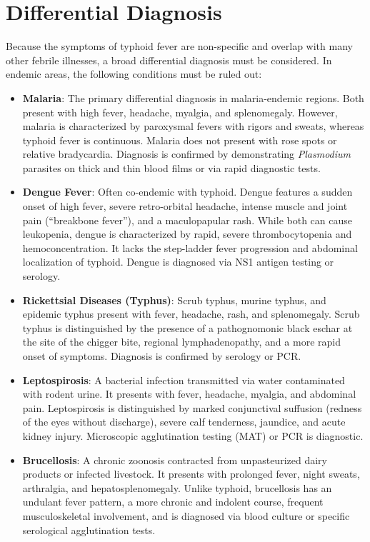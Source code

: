 \section*{Differential Diagnosis}
Because the symptoms of typhoid fever are non-specific and overlap with many other febrile illnesses, a broad differential diagnosis must be considered. In endemic areas, the following conditions must be ruled out:
\begin{itemize}
  \item \textbf{Malaria}: The primary differential diagnosis in malaria-endemic regions. Both present with high fever, headache, myalgia, and splenomegaly. However, malaria is characterized by paroxysmal fevers with rigors and sweats, whereas typhoid fever is continuous. Malaria does not present with rose spots or relative bradycardia. Diagnosis is confirmed by demonstrating \textit{Plasmodium} parasites on thick and thin blood films or via rapid diagnostic tests.
  \item \textbf{Dengue Fever}: Often co-endemic with typhoid. Dengue features a sudden onset of high fever, severe retro-orbital headache, intense muscle and joint pain (``breakbone fever''), and a maculopapular rash. While both can cause leukopenia, dengue is characterized by rapid, severe thrombocytopenia and hemoconcentration. It lacks the step-ladder fever progression and abdominal localization of typhoid. Dengue is diagnosed via NS1 antigen testing or serology.
  \item \textbf{Rickettsial Diseases (Typhus)}: Scrub typhus, murine typhus, and epidemic typhus present with fever, headache, rash, and splenomegaly. Scrub typhus is distinguished by the presence of a pathognomonic black eschar at the site of the chigger bite, regional lymphadenopathy, and a more rapid onset of symptoms. Diagnosis is confirmed by serology or PCR.
  \item \textbf{Leptospirosis}: A bacterial infection transmitted via water contaminated with rodent urine. It presents with fever, headache, myalgia, and abdominal pain. Leptospirosis is distinguished by marked conjunctival suffusion (redness of the eyes without discharge), severe calf tenderness, jaundice, and acute kidney injury. Microscopic agglutination testing (MAT) or PCR is diagnostic.
  \item \textbf{Brucellosis}: A chronic zoonosis contracted from unpasteurized dairy products or infected livestock. It presents with prolonged fever, night sweats, arthralgia, and hepatosplenomegaly. Unlike typhoid, brucellosis has an undulant fever pattern, a more chronic and indolent course, frequent musculoskeletal involvement, and is diagnosed via blood culture or specific serological agglutination tests.

\end{itemize}

